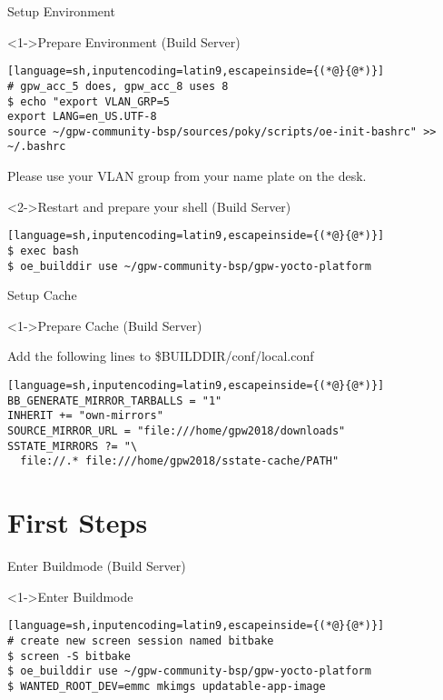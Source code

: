 \documentclass[ngerman,xcolor={table,dvipsnames},smaller,compress,hyperref={bookmarks,colorlinks},handout]{beamer}%
\begin{document}
\begin{frame}[fragile]{Setup Environment}
\begin{block}<1->{Prepare Environment (Build Server)}
\scriptsize
\begin{lstlisting}[language=sh,inputencoding=latin9,escapeinside={(*@}{@*)}]
# gpw_acc_5 does, gpw_acc_8 uses 8
$ echo "export VLAN_GRP=5
export LANG=en_US.UTF-8
source ~/gpw-community-bsp/sources/poky/scripts/oe-init-bashrc" >> ~/.bashrc
\end{lstlisting}
\end{block}

Please use your VLAN group from your name plate on the desk.

\begin{block}<2->{Restart and prepare your shell (Build Server)}
\begin{lstlisting}[language=sh,inputencoding=latin9,escapeinside={(*@}{@*)}]
$ exec bash
$ oe_builddir use ~/gpw-community-bsp/gpw-yocto-platform
\end{lstlisting}
\end{block}
\end{frame}

\begin{frame}[fragile]{Setup Cache}
\begin{block}<1->{Prepare Cache (Build Server)}

Add the following lines to \$BUILDDIR/conf/local.conf

\begin{lstlisting}[language=sh,inputencoding=latin9,escapeinside={(*@}{@*)}]
BB_GENERATE_MIRROR_TARBALLS = "1"
INHERIT += "own-mirrors"
SOURCE_MIRROR_URL = "file:///home/gpw2018/downloads"
SSTATE_MIRRORS ?= "\
  file://.* file:///home/gpw2018/sstate-cache/PATH"
\end{lstlisting}
\end{block}
\end{frame}

\part{First Steps}

\begin{frame}[fragile]{Enter Buildmode (Build Server)}
\begin{block}<1->{Enter Buildmode}
\small
\begin{lstlisting}[language=sh,inputencoding=latin9,escapeinside={(*@}{@*)}]
# create new screen session named bitbake
$ screen -S bitbake
$ oe_builddir use ~/gpw-community-bsp/gpw-yocto-platform
$ WANTED_ROOT_DEV=emmc mkimgs updatable-app-image
\end{lstlisting}
\end{block}
\end{frame}
\end{document}
